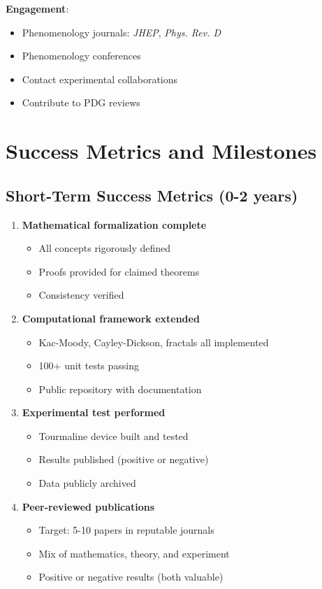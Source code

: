 \textbf{Engagement}:
\begin{itemize}
    \item Phenomenology journals: \textit{JHEP}, \textit{Phys. Rev. D}
    \item Phenomenology conferences
    \item Contact experimental collaborations
    \item Contribute to PDG reviews
\end{itemize}

\section{Success Metrics and Milestones}

\subsection{Short-Term Success Metrics (0-2 years)}

\begin{enumerate}
    \item \textbf{Mathematical formalization complete}
    \begin{itemize}
        \item All concepts rigorously defined
        \item Proofs provided for claimed theorems
        \item Consistency verified
    \end{itemize}

    \item \textbf{Computational framework extended}
    \begin{itemize}
        \item Kac-Moody, Cayley-Dickson, fractals all implemented
        \item 100+ unit tests passing
        \item Public repository with documentation
    \end{itemize}

    \item \textbf{Experimental test performed}
    \begin{itemize}
        \item Tourmaline device built and tested
        \item Results published (positive or negative)
        \item Data publicly archived
    \end{itemize}

    \item \textbf{Peer-reviewed publications}
    \begin{itemize}
        \item Target: 5-10 papers in reputable journals
        \item Mix of mathematics, theory, and experiment
        \item Positive or negative results (both valuable)
    \end{itemize}
\end{enumerate}

